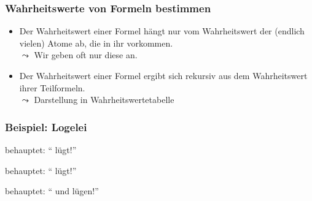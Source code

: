 \documentclass[aspectratio=1610,onlymath]{beamer}
\begin{document}
\begin{frame}\frametitle{Wahrheitswerte von Formeln bestimmen}

\begin{itemize}
\item Der Wahrheitswert einer Formel hängt nur vom Wahrheitswert der (endlich vielen) Atome ab, die in
ihr vorkommen.\\
$\leadsto$ Wir geben oft nur diese an.
\item Der Wahrheitswert einer Formel ergibt sich rekursiv aus dem Wahrheitswert ihrer Teilformeln.\\
$\leadsto$ Darstellung in Wahrheitswertetabelle
\end{itemize}


\end{frame}

\begin{frame}\frametitle{Beispiel: Logelei}

\Aname{} behauptet: "`\Bname{} lügt!"'\hfill {}
\bigskip

\Bname{} behauptet: "`\Cname{} lügt!"'\hfill {}
\bigskip

\Cname{} behauptet: "`\Aname{} und \Bname{} lügen!"'\hfill {}
\bigskip\bigskip

{\Large
{}
}

\medskip
{\footnotesize{}}

% 

\end{frame}
\end{document}
